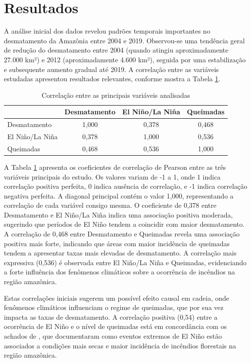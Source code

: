 \documentclass[12pt,a4paper]{article}
\begin{document}
\section{Resultados}

A análise inicial dos dados revelou padrões temporais importantes no desmatamento da Amazônia entre 2004 e 2019. Observou-se uma tendência geral de redução do desmatamento entre 2004 (quando atingiu aproximadamente 27.000 km²) e 2012 (aproximadamente 4.600 km²), seguida por uma estabilização e subsequente aumento gradual até 2019. A correlação entre as variáveis estudadas apresentou resultados relevantes, conforme mostra a Tabela \ref{tab:correlacao}.

\begin{table}[htbp]
\centering
\caption{Correlação entre as principais variáveis analisadas}
\label{tab:correlacao}
\begin{tabular}{lccc}
\toprule
                   & Desmatamento & El Niño/La Niña & Queimadas \\
\midrule
Desmatamento       & 1,000        & 0,378           & 0,468     \\
El Niño/La Niña    & 0,378        & 1,000           & 0,536     \\
Queimadas          & 0,468        & 0,536           & 1,000     \\
\bottomrule
\end{tabular}
\end{table}

A Tabela \ref{tab:correlacao} apresenta os coeficientes de correlação de Pearson entre as três variáveis principais do estudo. Os valores variam de -1 a 1, onde 1 indica correlação positiva perfeita, 0 indica ausência de correlação, e -1 indica correlação negativa perfeita. A diagonal principal contém o valor 1,000, representando a correlação de cada variável consigo mesma. O coeficiente de 0,378 entre Desmatamento e El Niño/La Niña indica uma associação positiva moderada, sugerindo que períodos de El Niño tendem a coincidir com maior desmatamento. A correlação de 0,468 entre Desmatamento e Queimadas revela uma associação positiva mais forte, indicando que áreas com maior incidência de queimadas tendem a apresentar taxas mais elevadas de desmatamento. A correlação mais expressiva (0,536) é observada entre El Niño/La Niña e Queimadas, evidenciando a forte influência dos fenômenos climáticos sobre a ocorrência de incêndios na região amazônica.

Estas correlações iniciais sugerem um possível efeito causal em cadeia, onde fenômenos climáticos influenciam o regime de queimadas, que por sua vez impacta as taxas de desmatamento. A correlação positiva (0,54) entre a ocorrência de El Niño e o nível de queimadas está em concordância com os achados de \citet{elnino}, que documentaram como eventos extremos de El Niño estão associados a condições mais secas e maior incidência de incêndios florestais na região amazônica.
\end{document}
